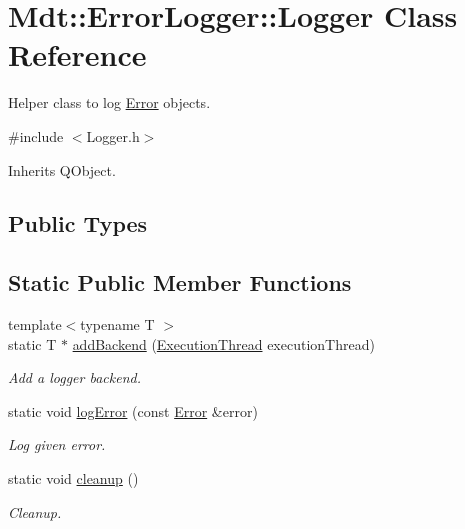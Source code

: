 \hypertarget{class_mdt_1_1_error_logger_1_1_logger}{}\section{Mdt\+:\+:Error\+Logger\+:\+:Logger Class Reference}
\label{class_mdt_1_1_error_logger_1_1_logger}


Helper class to log \hyperlink{class_mdt_1_1_error}{Error} objects.  




{\ttfamily \#include $<$Logger.\+h$>$}



Inherits Q\+Object.

\subsection*{Public Types}
\subsection*{Static Public Member Functions}
\begin{DoxyCompactItemize}
\item 
{\footnotesize template$<$typename T $>$ }\\static T $\ast$ \hyperlink{class_mdt_1_1_error_logger_1_1_logger_ae011d85c251d55660c3f90f21d1ab2a6}{add\+Backend} (\hyperlink{class_mdt_1_1_error_logger_1_1_logger_ab6d6198b43b2bb94cede114ec67b781c}{Execution\+Thread} execution\+Thread)
\begin{DoxyCompactList}\small\item\em Add a logger backend. \end{DoxyCompactList}\item 
static void \hyperlink{class_mdt_1_1_error_logger_1_1_logger_aa06a24a1d521258729ca172465b02040}{log\+Error} (const \hyperlink{class_mdt_1_1_error}{Error} \&error)
\begin{DoxyCompactList}\small\item\em Log given error. \end{DoxyCompactList}\item 
static void \hyperlink{class_mdt_1_1_error_logger_1_1_logger_a3bb1951ee52da826fde82dab52d54c4b}{cleanup} ()
\begin{DoxyCompactList}\small\item\em Cleanup. \end{DoxyCompactList}\end{DoxyCompactItemize}


